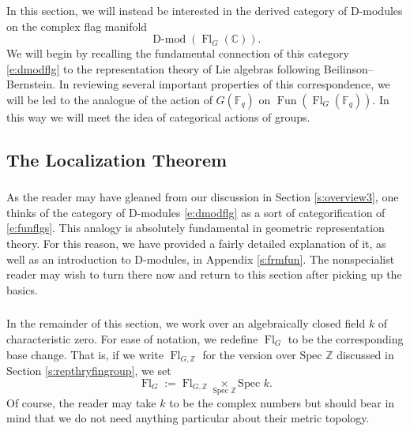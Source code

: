 \documentclass[10pt]{amsart}
\newcommand{\sB}{\on{Fl}_G}
\newcommand{\on}{\operatorname}
\newcommand{\Dmod}{\on{D-mod}}
\newcommand{\Fq}{\mathbb{F}_q}
\newcommand{\Fun}{\on{Fun}}
\theoremstyle{remark}
\newcommand{\Fl}{\operatorname{Fl}}
\newcommand{\C}{\ensuremath{\mathbb{C}}}
\newcommand{\Z}{\ensuremath{\mathbb{Z}}}
\newcommand{\Spec}{\text{Spec }}
\numberwithin{equation}{section}
\begin{document}
	In this section, we will instead be interested in the derived category of D-modules on the 
	complex flag manifold
	\begin{equation} \label{e:dmodflg}
	\Dmod(\sB(\C)).
	\end{equation}
		We will begin by recalling the fundamental connection of this category \eqref{e:dmodflg} to the representation theory of Lie algebras following Beilinson--Bernstein. In reviewing several important properties of this correspondence, we will be led to the analogue of the action of $G(\Fq)$ on $\Fun(\Fl_G(\Fq))$. In this way we will meet the idea of categorical actions of groups. 
	
	
	

	
	\subsection{The Localization Theorem}
	
	
	\subsubsection{} As the reader may have gleaned from our discussion in Section \ref{s:overview3}, one thinks of the category of D-modules \eqref{e:dmodflg} as a sort of categorification of \eqref{e:funflgs}. This analogy is absolutely fundamental in geometric representation theory. For this reason, we have provided a fairly detailed explanation of it, as well as an introduction to D-modules, in Appendix \ref{s:frmfun}. The nonspecialist reader may wish to turn there now and return to this section after picking up the basics. 

	
\subsubsection{} In the remainder of this section, we work over an algebraically closed field $k$ of characteristic zero. For ease of notation, we redefine $\Fl_G$ to be the corresponding base change. That is, if we write $\Fl_{G, \mathbb{Z}}$ for the version over $\Spec \Z$ discussed in Section \ref{s:repthryfingroup}, we set 
%
\[
 \Fl_G := \Fl_{G, \Z} \underset {\Spec \Z} \times \Spec k.
\]
%
Of course, the reader may take $k$ to be the complex numbers but should bear in mind that we do not need anything particular about their metric topology. 
\end{document}

